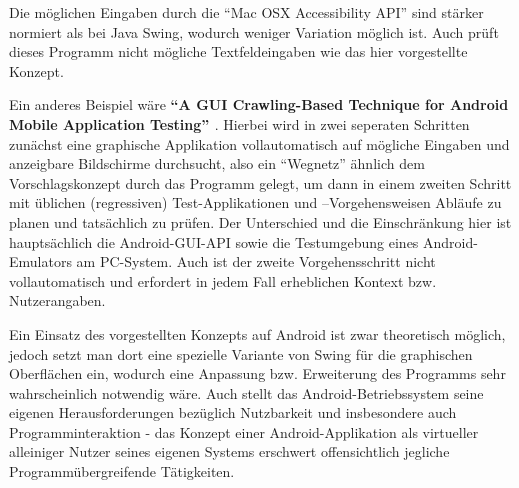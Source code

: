 Die möglichen Eingaben durch die ``Mac OSX Accessibility API'' sind stärker normiert als bei
Java Swing, wodurch weniger Variation möglich ist. Auch prüft dieses Programm nicht mögliche
Textfeldeingaben wie das hier vorgestellte Konzept.

\vspace{1cm}

Ein anderes Beispiel wäre \textbf{``A GUI Crawling-Based Technique for Android Mobile Application
Testing'' \cite{AGCBTFAMAT}}. Hierbei wird in zwei seperaten Schritten zunächst eine graphische Applikation
vollautomatisch auf mögliche Eingaben und anzeigbare Bildschirme durchsucht, also ein
``Wegnetz'' ähnlich dem Vorschlagskonzept durch das Programm gelegt, um dann in einem zweiten
Schritt mit üblichen (regressiven) Test-Applikationen und –Vorgehensweisen Abläufe zu
planen und tatsächlich zu prüfen. Der Unterschied und die Einschränkung hier ist
hauptsächlich die Android-GUI-API sowie die Testumgebung eines Android-Emulators am
PC-System. Auch ist der zweite Vorgehensschritt nicht vollautomatisch und erfordert in jedem Fall
erheblichen Kontext bzw. Nutzerangaben.

Ein Einsatz des vorgestellten Konzepts auf Android ist zwar theoretisch möglich, jedoch setzt
man dort eine spezielle Variante von Swing für die graphischen Oberflächen ein, 
wodurch eine Anpassung bzw. Erweiterung des Programms sehr wahrscheinlich notwendig wäre. 
Auch stellt das Android-Betriebssystem seine eigenen Herausforderungen
bezüglich Nutzbarkeit und insbesondere auch Programminteraktion - das Konzept
einer Android-Applikation als virtueller alleiniger Nutzer seines eigenen Systems
erschwert offensichtlich jegliche Programmübergreifende Tätigkeiten.
